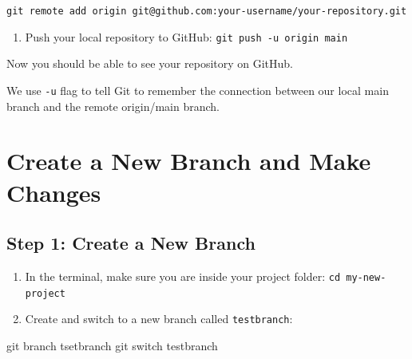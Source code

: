 \documentclass[
  11pt,
  letterpaper,
  DIV=11,
  numbers=noendperiod]{scrartcl}
\newenvironment{Shaded}{\begin{snugshade}}{\end{snugshade}}
\newcommand{\FunctionTok}[1]{\textcolor[rgb]{0.28,0.35,0.67}{#1}}
\newcommand{\NormalTok}[1]{\textcolor[rgb]{0.00,0.23,0.31}{#1}}
\providecommand{\tightlist}{%
  \setlength{\itemsep}{0pt}\setlength{\parskip}{0pt}}\usepackage{longtable,booktabs,array}
\let\textttOrig\texttt
\renewcommand{\texttt}[1]{\textttOrig{\colorbox{codebggray}{\textcolor{codefontcolor}{#1}}}}
\begin{document}
\texttt{git\ remote\ add\ origin\ git@github.com:your-username/your-repository.git}

\begin{enumerate}
\def\labelenumi{\arabic{enumi}.}
\setcounter{enumi}{3}
\tightlist
\item
  Push your local repository to GitHub:
  \texttt{git\ push\ -u\ origin\ main}
\end{enumerate}

Now you should be able to see your repository on GitHub.

\begin{tcolorbox}[enhanced jigsaw, rightrule=.15mm, coltitle=black, colback=white, arc=.35mm, titlerule=0mm, colbacktitle=quarto-callout-tip-color!10!white, breakable, left=2mm, toptitle=1mm, leftrule=.75mm, title=\textcolor{quarto-callout-tip-color}{\faLightbulb}\hspace{0.5em}{Tip}, opacityback=0, bottomrule=.15mm, toprule=.15mm, bottomtitle=1mm, opacitybacktitle=0.6, colframe=quarto-callout-tip-color-frame]

We use \texttt{-u} flag to tell Git to remember the connection between
our local main branch and the remote origin/main branch.

\end{tcolorbox}

\section{Create a New Branch and Make
Changes}\label{create-a-new-branch-and-make-changes}

\subsection{Step 1: Create a New
Branch}\label{step-1-create-a-new-branch}

\begin{enumerate}
\def\labelenumi{\arabic{enumi}.}
\tightlist
\item
  In the terminal, make sure you are inside your project folder:
  \texttt{cd\ my-new-project}
\item
  Create and switch to a new branch called \texttt{testbranch}:
\end{enumerate}

\begin{Shaded}
\begin{Highlighting}[]
\FunctionTok{git}\NormalTok{ branch tsetbranch}
\FunctionTok{git}\NormalTok{ switch testbranch}
\end{Highlighting}
\end{Shaded}
\end{document}
